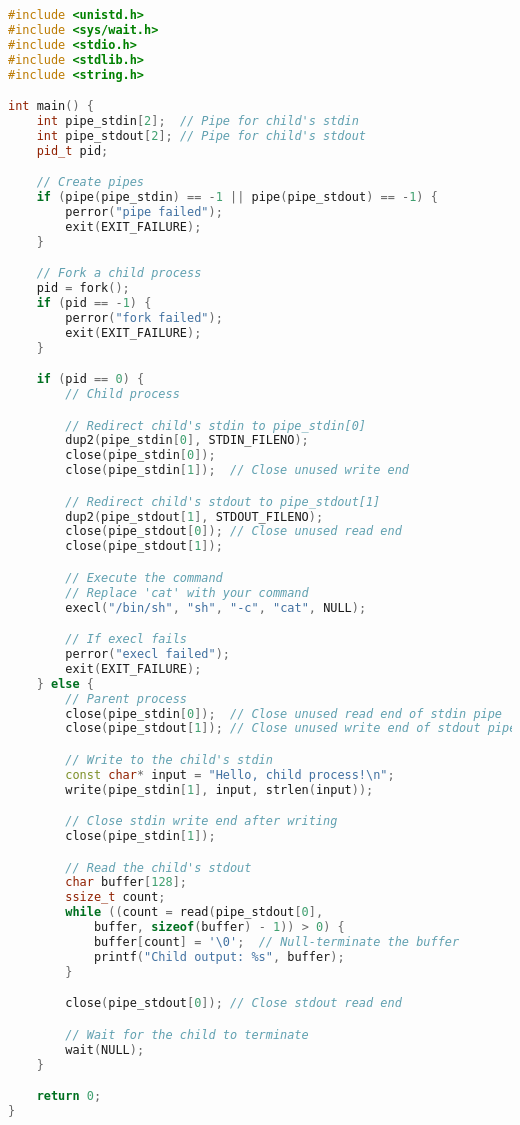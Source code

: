 \begin{lstlisting}[language=cpp]
#include <unistd.h>
#include <sys/wait.h>
#include <stdio.h>
#include <stdlib.h>
#include <string.h>

int main() {
    int pipe_stdin[2];  // Pipe for child's stdin
    int pipe_stdout[2]; // Pipe for child's stdout
    pid_t pid;

    // Create pipes
    if (pipe(pipe_stdin) == -1 || pipe(pipe_stdout) == -1) {
        perror("pipe failed");
        exit(EXIT_FAILURE);
    }

    // Fork a child process
    pid = fork();
    if (pid == -1) {
        perror("fork failed");
        exit(EXIT_FAILURE);
    }

    if (pid == 0) {
        // Child process

        // Redirect child's stdin to pipe_stdin[0]
        dup2(pipe_stdin[0], STDIN_FILENO);
        close(pipe_stdin[0]);
        close(pipe_stdin[1]);  // Close unused write end

        // Redirect child's stdout to pipe_stdout[1]
        dup2(pipe_stdout[1], STDOUT_FILENO);
        close(pipe_stdout[0]); // Close unused read end
        close(pipe_stdout[1]);

        // Execute the command
        // Replace 'cat' with your command
        execl("/bin/sh", "sh", "-c", "cat", NULL);

        // If execl fails
        perror("execl failed");
        exit(EXIT_FAILURE);
    } else {
        // Parent process
        close(pipe_stdin[0]);  // Close unused read end of stdin pipe
        close(pipe_stdout[1]); // Close unused write end of stdout pipe

        // Write to the child's stdin
        const char* input = "Hello, child process!\n";
        write(pipe_stdin[1], input, strlen(input));

        // Close stdin write end after writing
        close(pipe_stdin[1]);

        // Read the child's stdout
        char buffer[128];
        ssize_t count;
        while ((count = read(pipe_stdout[0],
            buffer, sizeof(buffer) - 1)) > 0) {
            buffer[count] = '\0';  // Null-terminate the buffer
            printf("Child output: %s", buffer);
        }

        close(pipe_stdout[0]); // Close stdout read end

        // Wait for the child to terminate
        wait(NULL);
    }

    return 0;
}
\end{lstlisting}
